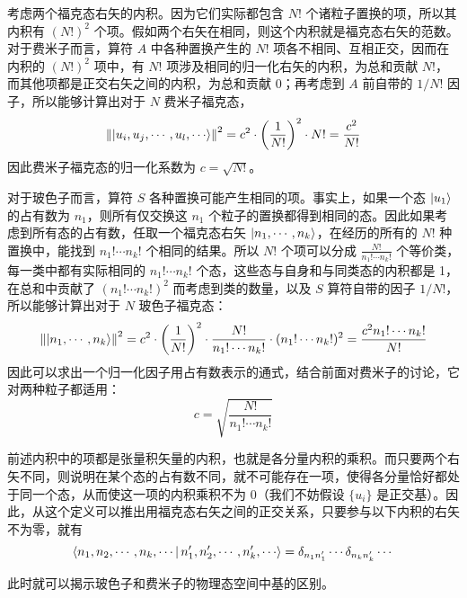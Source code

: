 \documentclass[cn,10pt,math=newtx,citestyle=gb7714-2015,bibstyle=gb7714-2015]{elegantbook}
\begin{document}
考虑两个福克态右矢的内积。因为它们实际都包含 $N!$ 个诸粒子置换的项，所以其内积有 $(N!)^2$ 个项。假如两个右矢在相同，则这个内积就是福克态右矢的范数。对于费米子而言，算符 $A$ 中各种置换产生的 $N!$ 项各不相同、互相正交，因而在内积的 $(N!)^2$ 项中，有 $N!$ 项涉及相同的归一化右矢的内积，为总和贡献 $N!$，而其他项都是正交右矢之间的内积，为总和贡献 0；再考虑到 $A$ 前自带的 $1/N!$ 因子，所以能够计算出对于 $N$ 费米子福克态，
\begin{equation}
    \left\|\ket{u_i,u_j,\cdots,u_l,\cdots}\right\|^2 = c^2\cdot\left(\frac 1{N!}\right)^2\cdot N! = \frac{c^2}{N!}
\end{equation}
因此费米子福克态的归一化系数为 $c=\sqrt{N!}$。

对于玻色子而言，算符 $S$ 各种置换可能产生相同的项。事实上，如果一个态 $\ket{u_1}$ 
的占有数为 $n_1$，则所有仅交换这 $n_1$ 个粒子的置换都得到相同的态。因此如果考虑到所有态的占有数，任取一个福克态右矢 $\ket{n_1,\cdots,n_k}$，在经历的所有的 $N!$ 种置换中，能找到 $n_1!\cdots n_k!$
个相同的结果。所以 $N!$ 个项可以分成 $\frac{N!}{n_1!\cdots n_k!}$
个等价类，每一类中都有实际相同的 $n_1!\cdots n_k!$
个态，这些态与自身和与同类态的内积都是 1，在总和中贡献了 $(n_1!\cdots n_k!)^2$ 
而考虑到类的数量，以及 $S$ 算符自带的因子 $1/N!$，所以能够计算出对于 $N$ 玻色子福克态：
\begin{equation}
    \left\|\ket{n_1,\cdots,n_k}\right\|^2 = c^2\cdot\left(\frac 1{N!}\right)^2\cdot\frac{N!}{n_1!\cdots n_k!}\cdot (n_1!\cdots n_k!)^2 = \frac{c^2 n_1!\cdots n_k!}{N!}
\end{equation}
因此可以求出一个归一化因子用占有数表示的通式，结合前面对费米子的讨论，它对两种粒子都适用：
\begin{equation}
    c = \sqrt{\frac{N!}{n_1!\cdots n_k!}}
\end{equation}

前述内积中的项都是张量积矢量的内积，也就是各分量内积的乘积。而只要两个右矢不同，则说明在某个态的占有数不同，就不可能存在一项，使得各分量恰好都处于同一个态，从而使这一项的内积乘积不为 0（我们不妨假设 $\{u_i\}$ 是正交基）。因此，从这个定义可以推出用福克态右矢之间的正交关系，只要参与以下内积的右矢不为零，就有
\begin{equation}
            \Braket{n_1,n_2,\cdots,n_k,\cdots|n_1',n_2',\cdots,n_k',\cdots} = \delta_{n_1n_1'}\cdots\delta_{n_kn_k'}\cdots
\end{equation}

此时就可以揭示玻色子和费米子的物理态空间中基的区别。
\end{document}
